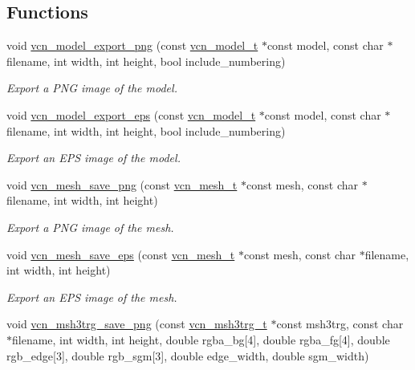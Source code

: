 \subsection*{Functions}
\begin{DoxyCompactItemize}
\item 
void \hyperlink{geometric__bot-cairo_8h_a3b8ba617ef66d703239f5eb74487971a}{vcn\+\_\+model\+\_\+export\+\_\+png} (const \hyperlink{geometric__bot_8h_a10375cbf3125046dc59bd4bef92432ad}{vcn\+\_\+model\+\_\+t} $\ast$const model, const char $\ast$filename, int width, int height, bool include\+\_\+numbering)
\begin{DoxyCompactList}\small\item\em Export a P\+N\+G image of the model. \end{DoxyCompactList}\item 
void \hyperlink{geometric__bot-cairo_8h_aff415fd425c1c8a60322e5eb45749ee0}{vcn\+\_\+model\+\_\+export\+\_\+eps} (const \hyperlink{geometric__bot_8h_a10375cbf3125046dc59bd4bef92432ad}{vcn\+\_\+model\+\_\+t} $\ast$const model, const char $\ast$filename, int width, int height, bool include\+\_\+numbering)
\begin{DoxyCompactList}\small\item\em Export an E\+P\+S image of the model. \end{DoxyCompactList}\item 
void \hyperlink{geometric__bot-cairo_8h_a404bf8be5f7e93e864721274dfaa4b69}{vcn\+\_\+mesh\+\_\+save\+\_\+png} (const \hyperlink{geometric__bot_8h_a8942da13867aa76dd55d8f2b079ad3ce}{vcn\+\_\+mesh\+\_\+t} $\ast$const mesh, const char $\ast$filename, int width, int height)
\begin{DoxyCompactList}\small\item\em Export a P\+N\+G image of the mesh. \end{DoxyCompactList}\item 
void \hyperlink{geometric__bot-cairo_8h_aab095b139981821f1d079e7da88102e8}{vcn\+\_\+mesh\+\_\+save\+\_\+eps} (const \hyperlink{geometric__bot_8h_a8942da13867aa76dd55d8f2b079ad3ce}{vcn\+\_\+mesh\+\_\+t} $\ast$const mesh, const char $\ast$filename, int width, int height)
\begin{DoxyCompactList}\small\item\em Export an E\+P\+S image of the mesh. \end{DoxyCompactList}\item 
void \hyperlink{geometric__bot-cairo_8h_aa096a0bdddf902a0cf2380d6397e8e4e}{vcn\+\_\+msh3trg\+\_\+save\+\_\+png} (const \hyperlink{geometric__bot_8h_af753a8fb5e30b4d81a02489e92b54df2}{vcn\+\_\+msh3trg\+\_\+t} $\ast$const msh3trg, const char $\ast$filename, int width, int height, double rgba\+\_\+bg\mbox{[}4\mbox{]}, double rgba\+\_\+fg\mbox{[}4\mbox{]}, double rgb\+\_\+edge\mbox{[}3\mbox{]}, double rgb\+\_\+sgm\mbox{[}3\mbox{]}, double edge\+\_\+width, double sgm\+\_\+width)

\end{DoxyCompactItemize}
